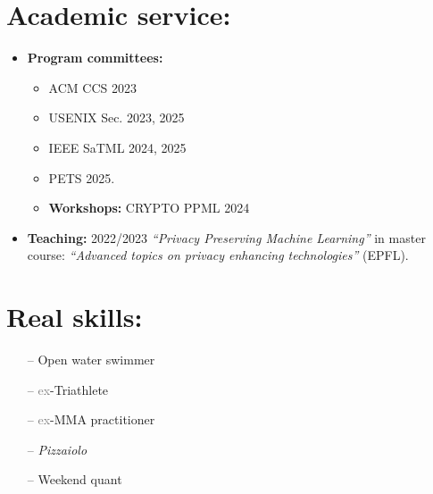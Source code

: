 \documentclass[margin, 10pt]{article} %
\begin{document}
\noindent\makebox[\linewidth]{\rule{.2\paperwidth}{0.3pt}}
\section*{Academic service:}  
\begin{itemize}
	\item \textbf{Program committees:}
	\begin{itemize}
		\item ACM CCS 2023
		\item USENIX Sec. 2023, 2025
		\item IEEE SaTML 2024, 2025
		\item PETS 2025.
	\end{itemize} 
	\begin{itemize}
		\item \textbf{Workshops:} CRYPTO PPML 2024
	\end{itemize}
	\item \textbf{Teaching:} 2022/2023 \textit{``Privacy Preserving Machine Learning''} in  master course: \textit{``Advanced topics on privacy enhancing technologies''} (EPFL).
\end{itemize}







\section*{Real skills:}  
\begin{itemize}
	\itemsep0em 
	\item[--] Open water swimmer 
	\item[--]  \textcolor{gray}{ex}-Triathlete
	\item[--]  \textcolor{gray}{ex}-MMA practitioner
\ifita
\else
	\item[--]  \textit{Pizzaiolo}
	\item[--]  Weekend quant
\fi
\end{itemize}

\noindent\makebox[\linewidth]{\rule{.2\paperwidth}{0.3pt}}
\end{document}
